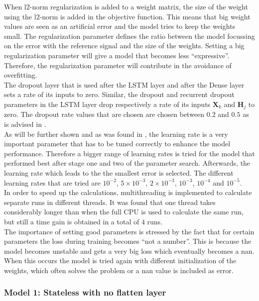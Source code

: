 When l2-norm regularization is added to a weight matrix, the size of the weight using the l2-norm is added in the objective function. This means that big weight values are seen as an artificial error and the model tries to keep the weights small. The regularization parameter defines the ratio between the model focussing on the error with the reference signal and the size of the weights. Setting a big regularization parameter will give a model that becomes less ``expressive''. Therefore, the regularization parameter will contribute in the avoidance of overfitting.\\ 
The dropout layer that is used after the LSTM layer and after the Dense layer sets a rate of its inputs to zero. Similar, the dropout and recurrent dropout parameters in the LSTM layer drop respectively a rate of its inputs $ \bm{X}_{k} $ and $ \bm{H}_{j} $ to zero. The dropout rate values that are chosen are chosen between $ 0.2 $ and $ 0.5 $ as is advised in \cite{Mele1993}.\\

As will be further shown and as was found in \cite{Greff2017}, the learning rate is a very important parameter that has to be tuned correctly to enhance the model performance. Therefore a bigger range of learning rates is tried for the model that performed best after stage one and two of the parameter search. Afterwards, the learning rate which leads to the the smallest error is selected. The different learning rates that are tried are $ 10^{-2} $, $ 5\times10^{-3} $, $ 2\times10^{-3} $, $ 10^{-3} $, $ 10^{-4} $ and $ 10^{-5} $. \\

In order to speed up the calculations, multithreading is implemented to calculate separate runs in different threads. It was found that one thread takes considerably longer than when the full CPU is used to calculate the same run, but still a time gain is obtained in a total of $ 4 $ runs.\\

The importance of setting good parameters is stressed by the fact that for certain parameters the loss during training becomes ``not a number''. This is because the model becomes unstable and gets a very big loss which eventually becomes a nan. When this occurs the model is tried again with different initialization of the weights, which often solves the problem or a nan value is included as error. 


\subsubsection{Model 1: Stateless with no flatten layer}

